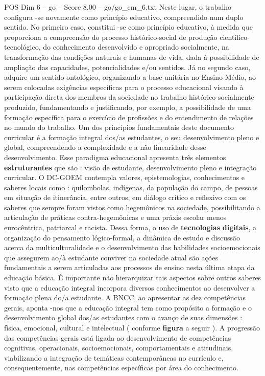 \begin{textsample}{POS Dim 6 – go – Score 8.00 – go/go\_em\_6.txt}
Neste lugar, o trabalho configura -se novamente como princípio educativo, compreendido num duplo sentido.
No primeiro caso, constitui -se como princípio educativo, à medida que proporciona a compreensão do processo histórico-social de produção científico-tecnológico, do conhecimento desenvolvido e apropriado socialmente, na transformação das condições naturais e humanas de vida, dada à possibilidade de ampliação das capacidades, potencialidades e/ou sentidos.
Já no segundo caso, adquire um sentido ontológico, organizando a base unitária no Ensino Médio, ao serem colocadas exigências específicas para o processo educacional visando à participação direta dos membros da sociedade no trabalho histórico-socialmente produzido, fundamentando e justificando, por exemplo, a possibilidade de uma formação específica para o exercício de profissões e do entendimento de relações no mundo do trabalho.
Um dos princípios fundamentais deste documento curricular é a formação integral dos/as estudantes, o seu desenvolvimento pleno e global, compreendendo a complexidade e a não linearidade desse desenvolvimento.
Esse paradigma educacional apresenta três elementos \textbf{estruturantes} que são : visão de estudante, desenvolvimento pleno e integração curricular.
O DC-GOEM contempla valores, epistemologias, conhecimentos e saberes locais como : quilombolas, indígenas, da população do campo, de pessoas em situação de itinerância, entre outros, em diálogo crítico e reflexivo com os saberes que sempre foram vistos como hegemônicos na sociedade, possibilitando a articulação de práticas contra-hegemônicas e uma práxis escolar menos eurocêntrica, patriarcal e racista.
Dessa forma, o uso de \textbf{tecnologias} \textbf{digitais}, a organização do pensamento lógico-formal, a dinâmica de estudo e discussão acerca da multiculturalidade e o desenvolvimento das habilidades socioemocionais que assegurem ao/à estudante conviver na sociedade atual são ações fundamentais a serem articuladas aos processos de ensino nesta última etapa da educação básica.
É importante não hierarquizar tais aspectos sobre outros saberes visto que a educação integral incorpora diversos conhecimentos ao desenvolver a formação plena do/a estudante.
A BNCC, ao apresentar as dez competências gerais, aponta -nos que a educação integral tem como propósito a formação e o desenvolvimento global dos/as estudantes com o avanço de suas dimensões : física, emocional, cultural e intelectual ( conforme \textbf{figura} a seguir ).
A progressão das competências gerais está ligada ao desenvolvimento de competências cognitivas, operacionais, socioemocionais, comportamentais e atitudinais, viabilizando a integração de temáticas contemporâneas no currículo e, consequentemente, nas competências específicas por área do conhecimento.

\end{textsample}

